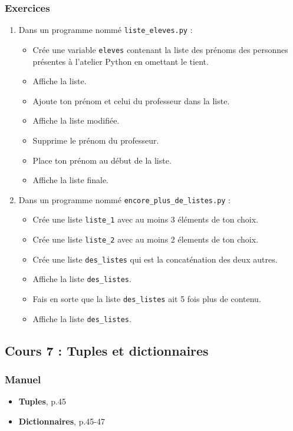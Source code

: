\documentclass[11pt]{article}
\begin{document}
\subsubsection*{Exercices}
\label{sec:org85f84a5}
\begin{enumerate}
\item Dans un programme nommé \texttt{liste\_eleves.py} :
\begin{itemize}
\item Crée une variable \texttt{eleves} contenant la liste des prénoms des personnes présentes à l'atelier Python en omettant le tient.
\item Affiche la liste.
\item Ajoute ton prénom et celui du professeur dans la liste.
\item Affiche la liste modifiée.
\item Supprime le prénom du professeur.
\item Place ton prénom au début de la liste.
\item Affiche la liste finale.
\end{itemize}

\item Dans un programme nommé \texttt{encore\_plus\_de\_listes.py} :
\begin{itemize}
\item Crée une liste \texttt{liste\_1} avec au moins 3 éléments de ton choix.
\item Crée une liste \texttt{liste\_2} avec au moins 2 élements de ton choix.
\item Crée une liste \texttt{des\_listes} qui est la concaténation des deux autres.
\item Affiche la liste \texttt{des\_listes}.
\item Fais en sorte que la liste \texttt{des\_listes} ait 5 fois plus de contenu.
\item Affiche la liste \texttt{des\_listes}.
\end{itemize}
\end{enumerate}

\subsection*{Cours 7 : Tuples et dictionnaires}
\label{chapitre2_cours7}
\subsubsection*{Manuel}
\label{sec:org6d40443}
\begin{itemize}
\item \textbf{\og Tuples\fg{}}, p.45
\item \textbf{\og Dictionnaires\fg{}}, p.45-47
\end{itemize}
\end{document}
